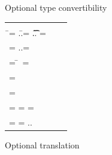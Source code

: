 \documentclass[runnningheads]{tex/llncs}
\begin{document}
\begin{figure}[hb]
	\hrulefill  \small  \vspace{-3mm}
	
	\begin{mathpar}
		
		
	\end{mathpar}
	\vspace{-8mm}
	
	\hrulefill\caption{Optional type convertibility}\label{tsts2}
\end{figure}


\begin{figure}[hb]	
	\hrulefill
	
	\smallskip
	
	\begin{tabular}{@{}l@{~ ~ ~ ~~~~~~~~~~~~~~~~~~~~~~~~~~~~~~~~~~~~}ll}
		\small
		\begin{minipage}{8cm}  
			\begin{tabbing}
				\TR{\Class \C{\fd[1]..}{\md[1] .. } } = \src{ \Class \C{ \fdp[1]..}{\mdp[1]..}}\\ \HS\HS\HS\HS\HS\HS\HS\HS\HS\HS\HS\HS\HS\HS\HS\HS \WHERE\HS
				\=\fdp[1] = \src{\Ftype\f\any}..\HS\HS\=\fd[1] = \Ftype\f\t .. \HS\HS\=\md[1] = \Mdef\m\x{\t[1]}{\t[2]}\e \\
				\>\mdp[1] = \src{\Mdef\m\x\any\any\ep}..\HS\HS \>\>\ep = \TR{\e}
			\end{tabbing}
			\begin{tabbing}
				\TR{\FRead\f}\HS\HS\HS\HS\= = \src{\FRead\f}
				\\
				\TR{\FWrite\f\e} \> = \src{\FWrite\f\ep} \HS\HS\HS\HS\HS\=\WHERE~\ep=\TR\e
				\\
				\TR\this           \>= \src{\SubCast\any\this}
				\\
				\TR\x \> = \src \x
				\\
				\TR{\Call{\e[1]}\m{\e[2]}} \> = \src{\DynCall{\ep[1]}{\m}{\ep[2]}} \HS\>\WHERE\HS\ep[1] = \TR{ \e[1]} \HS \ep[2] = \TR{\e[2]}
				\\
				\TR{\New\C{\e[1]..}} \> = \src{\SubCast\any{\New\C{\ep[1]..}}} \HS \>\WHERE \HS   \ep[1] = \TR{\e[1]} ..
			\end{tabbing}
		\end{minipage}
	\end{tabular}
	
	\smallskip
	\hrulefill
	\caption{Optional translation}\label{tst2}
	
\end{figure}
\end{document}
